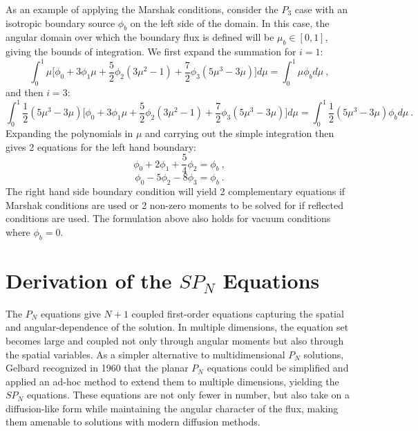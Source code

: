As an example of applying the Marshak conditions, consider the $P_3$
case with an isotropic boundary source $\phi_b$ on the left side of
the domain. In this case, the angular domain over which the boundary
flux is defined will be $\mu_b \in [0,1]$, giving the bounds of
integration. We first expand the summation for $i=1$:
\begin{equation}
  \int_0^1 \mu \Bigg[ \phi_0 + 3\phi_1\mu +
    \frac{5}{2}\phi_2(3\mu^2-1) + \frac{7}{2}\phi_3(5\mu^3-3\mu)
    \Bigg] d\mu = \int_0^1 \mu \phi_b d\mu\:,
  \label{eq:marshak_p1_deriv_1}
\end{equation}
and then $i=3$:
\begin{equation}
  \int_0^1 \frac{1}{2}(5\mu^3-3\mu) \Bigg[ \phi_0 + 3\phi_1\mu +
    \frac{5}{2}\phi_2(3\mu^2-1) + \frac{7}{2}\phi_3(5\mu^3-3\mu)
    \Bigg] d\mu = \int_0^1 \frac{1}{2}(5\mu^3-3\mu) \phi_b d\mu\:.
  \label{eq:marshak_p3_deriv_1}
\end{equation}
Expanding the polynomials in $\mu$ and carrying out the simple
integration then gives 2 equations for the left hand boundary:
\begin{equation}
  \phi_0 + 2\phi_1 + \frac{5}{4}\phi_2 = \phi_b\:,
  \label{eq:marshak_p1_deriv_2}
\end{equation}
\begin{equation}
  \phi_0 - 5\phi_2 - 8\phi_3 = \phi_b\:.
  \label{eq:marshak_p1_deriv_3}
\end{equation}
The right hand side boundary condition will yield 2 complementary
equations if Marshak conditions are used or 2 non-zero moments to be
solved for if reflected conditions are used. The formulation above
also holds for vacuum conditions where $\phi_b = 0$.

\section{Derivation of the $SP_N$ Equations}
\label{sec:spn_equations}
The $P_N$ equations give $N+1$ coupled first-order equations
capturing the spatial and angular-dependence of the solution. In
multiple dimensions, the equation set becomes large and coupled not
only through angular moments but also through the spatial
variables. As a simpler alternative to multidimensional $P_N$
solutions, Gelbard recognized in 1960 that the planar $P_N$ equations
could be simplified and applied an ad-hoc method to extend them to
multiple dimensions, yielding the $SP_N$ equations. These equations
are not only fewer in number, but also take on a diffusion-like form
while maintaining the angular character of the flux, making them
amenable to solutions with modern diffusion methods.

